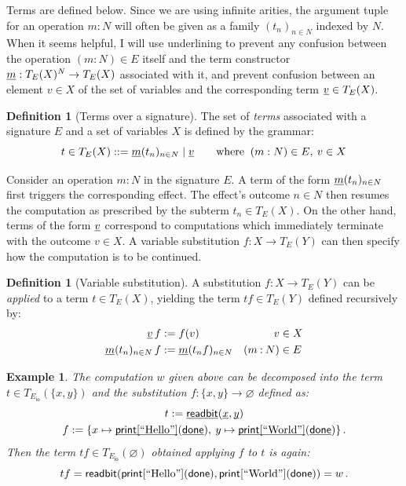 \documentclass[11pt,oneside,draft]{book}
\newtheorem{example}[theorem]{Example}
\theoremstyle{definition}
\newtheorem{definition}[theorem]{Definition}
\newcommand{\kw}[1]{\ensuremath{ \mathsf{#1} }}
\newcommand{\ul}[1]{%
  \underline{\smash{#1}}
}
\begin{document}
Terms are defined below.
Since we are using infinite arities,
the argument tuple for an operation $m \mathbin: N$
will often be given as a family $(t_n)_{n \in N}$
indexed by $N$.
When it seems helpful,
I will use underlining
to prevent any confusion between
the operation $(m \mathbin: N) \in E$ itself
and the term constructor $\ul{m} : T_E(X)^N \rightarrow T_E(X)$
associated with it,
and prevent confusion between an element $v \in X$ of the set of variables
and the corresponding term $\ul{v} \in T_E(X)$.

\begin{definition}[Terms over a signature] %
The set of \emph{terms} associated with
a signature $E$ and a set of variables $X$
is defined by the grammar:
\[
  t \in T_E(X) ::=
    \ul{m}(t_n)_{n \in N} \mid
    \ul{v}
  \qquad
  \text{where }
  \:
    (m : N) \in E, \:
    v \in X
\]
\end{definition}

Consider an operation $m \mathbin: N$ in the signature $E$.
A term of the form $\ul{m}(t_n)_{n \in N}$
first triggers the corresponding effect.
The effect's outcome $n \in N$ then resumes the computation
as prescribed by the subterm $t_n \in T_E(X)$.
On the other hand,
terms of the form $\ul{v}$ correspond to computations
which immediately terminate with the outcome $v \in X$.
A variable substitution $f : X \rightarrow T_E(Y)$
can then specify how the computation is to be continued.

\begin{definition}[Variable substitution] %
A substitution $f : X \rightarrow T_E(Y)$
can be \emph{applied} to a term $t \in T_E(X)$,
yielding the term $t f \in T_E(Y)$
defined recursively by:
\begin{align*}
  \ul{v} \, f &:= f(v) & v &\in X \\
  \ul{m}(t_n)_{n \in N} \, f &:=
    \ul{m}(t_n f)_{n \in N} & (m \mathbin: N) &\in E
\end{align*}
\end{definition}

\begin{example} %
The computation $w$ given above can be decomposed into
the term $t \in T_{E_\kw{io}}(\{x, y\})$ and
the substitution $f : \{x, y\} \rightarrow \varnothing$
defined as:
\begin{gather*}
  t := \ul{\kw{readbit}}(\ul{x}, \ul{y})
  \\
  f := \{
    x \mapsto \ul{\kw{print}[\text{\rm ``Hello''}]}(
                \ul{\kw{done}}), \:
    y \mapsto \ul{\kw{print}[\text{\rm ``World''}]}(
                \ul{\kw{done}})
  \}
  \,.
\end{gather*}
Then the term
$tf \in T_{E_\kw{io}}(\varnothing)$
obtained applying $f$ to $t$ is again:
\[
  t f =
    \kw{readbit}(
      \kw{print}[\text{\rm ``Hello''}](\kw{done}),
      \kw{print}[\text{\rm ``World''}](\kw{done}))
    = w
  \,.
\]
\end{example}
\end{document}
